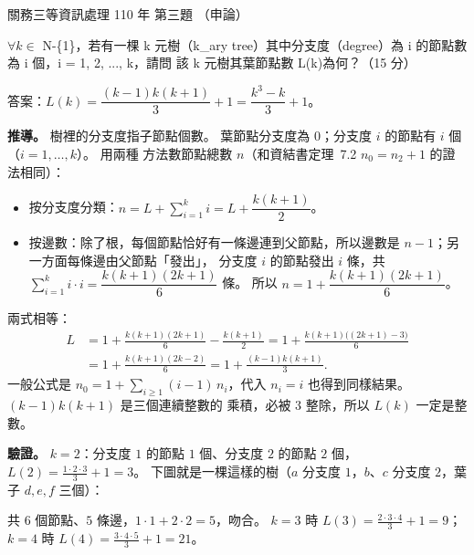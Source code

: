 \begin{pastexam}[label={px:gw3-110-ds-03}]{關務三等資訊處理 110 年 第三題}
（申論）

$\forall k \in$ N-\{1\}，若有一棵 k 元樹（k\_ary tree）其中分支度（degree）為 i 的節點數為 i 個，i = 1, 2, ..., k，請問
該 k 元樹其葉節點數 L(k)為何？（15 分）
\end{pastexam}

\begin{pastsoln}
答案：$L(k) = \dfrac{(k-1)k(k+1)}{3} + 1 = \dfrac{k^3 - k}{3} + 1$。

\textbf{推導。} 樹裡的分支度指子節點個數。 葉節點分支度為 $0$；分支度 $i$ 的節點有 $i$ 個（$i = 1, \ldots, k$）。 用兩種
方法數節點總數 $n$（和資結書定理~7.2 $n_0 = n_2 + 1$ 的證法相同）：
\begin{itemize}
\item 按分支度分類：$n = L + \sum_{i=1}^{k} i = L + \dfrac{k(k+1)}{2}$。
\item 按邊數：除了根，每個節點恰好有一條邊連到父節點，所以邊數是 $n - 1$；另一方面每條邊由父節點「發出」，
分支度 $i$ 的節點發出 $i$ 條，共 $\sum_{i=1}^{k} i \cdot i = \dfrac{k(k+1)(2k+1)}{6}$ 條。 所以
$n = 1 + \dfrac{k(k+1)(2k+1)}{6}$。
\end{itemize}
兩式相等：
\begin{align*}
L &= 1 + \frac{k(k+1)(2k+1)}{6} - \frac{k(k+1)}{2}
   = 1 + \frac{k(k+1)\bigl((2k+1) - 3\bigr)}{6} \\
  &= 1 + \frac{k(k+1)(2k-2)}{6}
   = 1 + \frac{(k-1)k(k+1)}{3}.
\end{align*}
一般公式是 $n_0 = 1 + \sum_{i \ge 1} (i-1)\, n_i$，代入 $n_i = i$ 也得到同樣結果。 $(k-1)k(k+1)$ 是三個連續整數的
乘積，必被 $3$ 整除，所以 $L(k)$ 一定是整數。

\textbf{驗證。} $k = 2$：分支度 $1$ 的節點 $1$ 個、分支度 $2$ 的節點 $2$ 個，$L(2) = \frac{1 \cdot 2 \cdot 3}{3} + 1 = 3$。
下圖就是一棵這樣的樹（$a$ 分支度 $1$，$b$、$c$ 分支度 $2$，葉子 $d, e, f$ 三個）：
\begin{center}
\end{center}
共 $6$ 個節點、$5$ 條邊，$1 \cdot 1 + 2 \cdot 2 = 5$，吻合。 $k = 3$ 時 $L(3) = \frac{2 \cdot 3 \cdot 4}{3} + 1 = 9$；
$k = 4$ 時 $L(4) = \frac{3 \cdot 4 \cdot 5}{3} + 1 = 21$。
\end{pastsoln}
